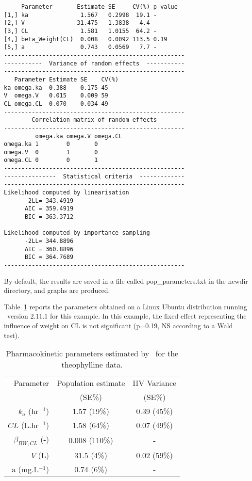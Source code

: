 \begin{verbatim}
     Parameter       Estimate SE     CV(%) p-value
[1,] ka               1.567   0.2998  19.1 -      
[2,] V               31.475   1.3838   4.4 -      
[3,] CL               1.581   1.0155  64.2 -      
[4,] beta_Weight(CL)  0.008   0.0092 113.5 0.19   
[5,] a                0.743   0.0569   7.7 -      
----------------------------------------------------
-----------  Variance of random effects  -----------
----------------------------------------------------
   Parameter Estimate SE    CV(%)
ka omega.ka  0.388    0.175 45   
V  omega.V   0.015    0.009 59   
CL omega.CL  0.070    0.034 49   
----------------------------------------------------
------  Correlation matrix of random effects  ------
----------------------------------------------------
         omega.ka omega.V omega.CL
omega.ka 1        0       0       
omega.V  0        1       0       
omega.CL 0        0       1       
----------------------------------------------------
---------------  Statistical criteria  -------------
----------------------------------------------------
Likelihood computed by linearisation
      -2LL= 343.4919 
      AIC = 359.4919 
      BIC = 363.3712 

Likelihood computed by importance sampling
      -2LL= 344.8896 
      AIC = 360.8896 
      BIC = 364.7689 
----------------------------------------------------
\end{verbatim}
By default, the results are saved in a file called {\sf pop\_parameters.txt} in the {\sf newdir} directory, and graphs are produced.

Table~\ref{tab:paramtheo} reports the parameters obtained on a Linux Ubuntu distribution running \R~version 2.11.1 for this example. In this example, the fixed effect representing the influence of weight on CL is not significant (p=0.19, NS according to a Wald test).
\begin{table}[!h]
\begin{center}
\begin{tabular}{r c c}
\hline
Parameter & Population estimate & IIV Variance \\
& (SE\%) & (SE\%) \\
\hline
$k_{a}$ (hr$^{-1}$) & 1.57 (19\%) & 0.39 (45\%)\\
$CL$ (L.hr$^{-1}$) & 1.58 (64\%) & 0.07 (49\%) \\ 
$\beta_{BW,CL}$ (-) & 0.008 (110\%) & - \\
$V$ (L) & 31.5 (4\%) & 0.02 (59\%) \\
a (mg.L$^{-1}$) & 0.74 (6\%) & - \\
\hline
\end{tabular} 
\caption{Pharmacokinetic parameters estimated by \saemix~for the theophylline data.} \label{tab:paramtheo}
\end{center}
\end{table}

